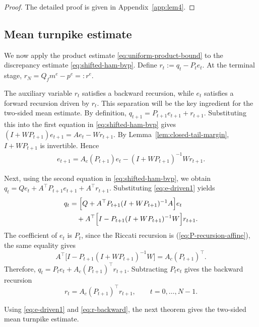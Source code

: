 \documentclass[10pt,journal,twoside]{IEEEtran}
\theoremstyle{definition}
\theoremstyle{remark}
\begin{document}
\begin{proof}
	{The detailed proof is given in
	Appendix~\ref{app:lem4}.}
\end{proof}





\subsection{Mean turnpike estimate}
\label{subsec:terminal-adjoint-layer}

We now apply the product estimate \eqref{eq:uniform-product-bound} to the discrepancy estimate \eqref{eq:shifted-ham-bvp}.
Define $r_t:=q_t-P_te_t$.
At the terminal stage,
$r_N=Q_fm^e-p^e=:r^e$.

The auxiliary variable \(r_t\) satisfies a backward recursion, while \(e_t\) satisfies a forward recursion driven by \(r_t\).  This separation will be the key ingredient for the two-sided mean estimate. By definition,
\(q_{t+1}=P_{t+1}e_{t+1}+r_{t+1}.\)
Substituting this into the first equation in \eqref{eq:shifted-ham-bvp}
gives $(I+WP_{t+1})e_{t+1}=Ae_t-Wr_{t+1}$.
By Lemma~\ref{lem:closed-tail-margin}, \(I+WP_{t+1}\) is invertible. Hence
\begin{equation}
	\begin{aligned}
		e_{t+1}=
		A_c(P_{t+1})e_t
		-(I+WP_{t+1})^{-1}Wr_{t+1} .
	\end{aligned}
	\label{eq:e-driven1}
\end{equation}

Next, using the second equation in \eqref{eq:shifted-ham-bvp},
we obtain
$q_t=Qe_t+A^\top P_{t+1}e_{t+1}+A^\top r_{t+1}$.
Substituting \eqref{eq:e-driven1} yields
\begin{align*}
	q_t
	&=
	\Big[
	Q+A^\top P_{t+1}(I+WP_{t+1})^{-1}A
	\Big]e_t
	\notag\\
	&\quad+
	A^\top
	\Big[
	I-P_{t+1}(I+WP_{t+1})^{-1}W
	\Big]r_{t+1}.
\end{align*}
The coefficient of \(e_t\) is \(P_t\), since the Riccati recursion is (\ref{eq:P-recursion-affine}),
the same equality gives
$$
A^\top
	\Big[
	I-P_{t+1}(I+WP_{t+1})^{-1}W
	\Big] 
	=
	A_c(P_{t+1})^\top.
$$
Therefore,
\(
q_t
=
P_te_t+A_c(P_{t+1})^\top r_{t+1}.
\)
Subtracting \(P_te_t\) gives the backward recursion
\begin{equation}
	r_t
	=
	A_c(P_{t+1})^\top r_{t+1},
	\qquad t=0,\ldots,N-1 .
	\label{eq:r-backward}
\end{equation}

Using \eqref{eq:e-driven1} and \eqref{eq:r-backward}, the next theorem gives the two-sided mean turnpike estimate. 
\end{document}
